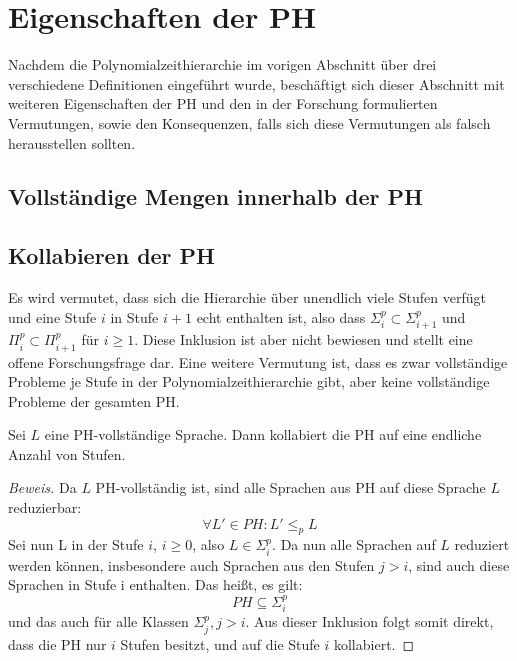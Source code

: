 \chapter{Eigenschaften der PH} \label{chapter: Eigenschaften der PH}
Nachdem die Polynomialzeithierarchie im vorigen Abschnitt über drei verschiedene Definitionen eingeführt wurde, beschäftigt sich dieser Abschnitt mit 
weiteren Eigenschaften der PH und den in der Forschung formulierten Vermutungen, sowie den Konsequenzen, falls sich diese Vermutungen als falsch herausstellen sollten.

\section{Vollständige Mengen innerhalb der PH} \label{section: Vollständige Mengen innerhalb der PH}

\section{Kollabieren der PH} \label{section: Kollabieren der PH}
Es wird vermutet, dass sich die Hierarchie über unendlich viele Stufen verfügt und eine Stufe $i$ in Stufe $i + 1$ echt enthalten ist,
also dass $\Sigma^p_i \subset \Sigma^p_{i+1}$ und $\Pi^p_i \subset \Pi^p_{i+1}$ für $i \geq 1$. Diese Inklusion ist aber nicht bewiesen und stellt eine offene
Forschungsfrage dar. Eine weitere Vermutung ist, dass es zwar vollständige Probleme je Stufe in der Polynomialzeithierarchie gibt, aber keine vollständige Probleme der gesamten PH.
\begin{theorem}
    Sei $L$ eine PH-vollständige Sprache. Dann kollabiert die PH auf eine endliche Anzahl von Stufen. 
\end{theorem}

\begin{proof}[Beweis]
    Da $L$ PH-vollständig ist, sind alle Sprachen aus PH auf diese Sprache $L$ reduzierbar:
    $$
    \forall L' \in PH: L' \leq_p L
    $$
    Sei nun L in der Stufe $i$, $i \geq 0$, also $L \in \Sigma^p_i$. Da nun alle Sprachen auf $L$ reduziert werden können, insbesondere
    auch Sprachen aus den Stufen $j > i$, sind auch diese Sprachen in Stufe i enthalten.
    Das heißt, es gilt: 
    $$
    PH \subseteq \Sigma^p_i
    $$ 
    und das auch für alle Klassen $\Sigma^p_j, j> i$.
    Aus dieser Inklusion folgt somit direkt, dass die PH nur $i$ Stufen besitzt, und auf die Stufe $i$ kollabiert.
\end{proof}

